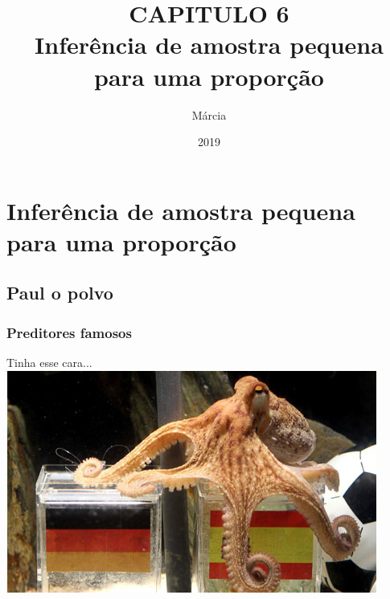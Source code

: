 \documentclass[11pt]{beamer}
\title{CAPITULO 6 \\ Inferência de amostra pequena para uma proporção}
\author{Márcia}
\institute{Instituto de Matemática e Estatística \\Faculdade de Estatística}
\date{2019}
\begin{document}
\maketitle

\section{Inferência de amostra pequena para uma proporção}


\subsection{Paul o polvo}


\begin{frame}
\frametitle{Preditores famosos}

{
\pause
Tinha esse cara...
\includegraphics[width=\textwidth]{paul.png}
}

\end{frame}
\end{document}
